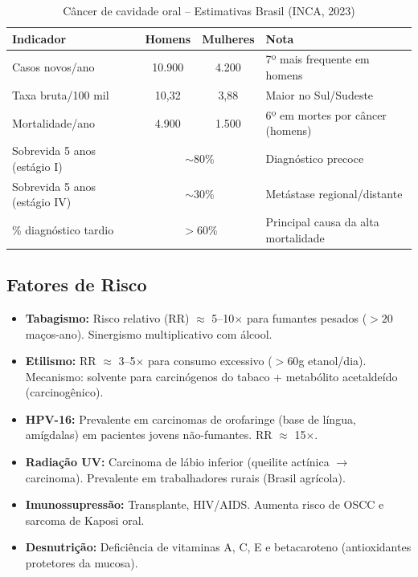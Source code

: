 \begin{table}[H]
  \centering
  \caption{Câncer de cavidade oral -- Estimativas Brasil (INCA, 2023)}
  \label{tab:inca-oral}
  \begin{tabularx}{\textwidth}{lccX}
    \toprule
    \textbf{Indicador} & \textbf{Homens} & \textbf{Mulheres} & \textbf{Nota} \\
    \midrule
    Casos novos/ano & 10.900 & 4.200 & 7º mais frequente em homens \\
    Taxa bruta/100 mil & 10,32 & 3,88 & Maior no Sul/Sudeste \\
    Mortalidade/ano & 4.900 & 1.500 & 6º em mortes por câncer (homens) \\
    Sobrevida 5 anos (estágio I) & \multicolumn{2}{c}{$\sim$80\%} & Diagnóstico precoce \\
    Sobrevida 5 anos (estágio IV) & \multicolumn{2}{c}{$\sim$30\%} & Metástase regional/distante \\
    \% diagnóstico tardio & \multicolumn{2}{c}{$> 60\%$} & Principal causa da alta mortalidade \\
    \bottomrule
  \end{tabularx}
\end{table}

\subsection{Fatores de Risco}

\begin{itemize}
  \item \textbf{Tabagismo:} Risco relativo (RR) $\approx$ 5--10$\times$ para
        fumantes pesados ($> 20$ maços-ano). Sinergismo multiplicativo com álcool.
  \item \textbf{Etilismo:} RR $\approx$ 3--5$\times$ para consumo excessivo
        ($> 60$g etanol/dia). Mecanismo: solvente para carcinógenos do tabaco +
        metabólito acetaldeído (carcinogênico).
  \item \textbf{HPV-16:} Prevalente em carcinomas de orofaringe (base de língua,
        amígdalas) em pacientes jovens não-fumantes. RR $\approx$ 15$\times$.
  \item \textbf{Radiação UV:} Carcinoma de lábio inferior (queilite actínica $\to$
        carcinoma). Prevalente em trabalhadores rurais (Brasil agrícola).
  \item \textbf{Imunossupressão:} Transplante, HIV/AIDS. Aumenta risco de OSCC e
        sarcoma de Kaposi oral.
  \item \textbf{Desnutrição:} Deficiência de vitaminas A, C, E e betacaroteno
        (antioxidantes protetores da mucosa).
\end{itemize}

